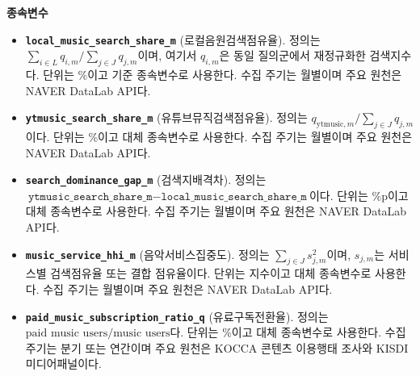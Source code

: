 \documentclass[11pt,a4paper]{report}
\newenvironment{summarylist}{\begin{itemize}[leftmargin=1.8em,itemsep=0.35em,topsep=0.35em]\RaggedRight}{\end{itemize}}
\begin{document}
\begingroup
\footnotesize
\noindent\textbf{종속변수}
\begin{summarylist}
  \item \textbf{\nolinkurl{local_music_search_share_m}} (로컬음원검색점유율). 정의는 $\sum_{i \in L} q_{i,m} / \sum_{j \in J} q_{j,m}$이며, 여기서 $q_{i,m}$은 동일 질의군에서 재정규화한 검색지수다. 단위는 \%이고 기준 종속변수로 사용한다. 수집 주기는 월별이며 주요 원천은 NAVER DataLab API다.
  \item \textbf{\texttt{ytmusic\_search\_share\_m}} (유튜브뮤직검색점유율). 정의는 $q_{\mathrm{ytmusic},m} / \sum_{j \in J} q_{j,m}$이다. 단위는 \%이고 대체 종속변수로 사용한다. 수집 주기는 월별이며 주요 원천은 NAVER DataLab API다.
  \item \textbf{\texttt{search\_dominance\_gap\_m}} (검색지배격차). 정의는 $\texttt{ytmusic\_search\_share\_m} - \texttt{local\_music\_search\_share\_m}$이다. 단위는 \%p이고 대체 종속변수로 사용한다. 수집 주기는 월별이며 주요 원천은 NAVER DataLab API다.
  \item \textbf{\texttt{music\_service\_hhi\_m}} (음악서비스집중도). 정의는 $\sum_{j \in J} s_{j,m}^{2}$이며, $s_{j,m}$는 서비스별 검색점유율 또는 결합 점유율이다. 단위는 지수이고 대체 종속변수로 사용한다. 수집 주기는 월별이며 주요 원천은 NAVER DataLab API다.
  \item \textbf{\nolinkurl{paid_music_subscription_ratio_q}} (유료구독전환율). 정의는 $\text{paid music users}/\text{music users}$다. 단위는 \%이고 대체 종속변수로 사용한다. 수집 주기는 분기 또는 연간이며 주요 원천은 KOCCA 콘텐츠 이용행태 조사와 KISDI 미디어패널이다.
\end{summarylist}
\end{document}
